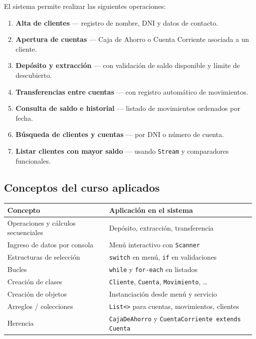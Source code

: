\documentclass[12pt, a4paper]{article}
\begin{document}
El sistema permite realizar las siguientes operaciones:

\begin{enumerate}[leftmargin=1.5cm, label=\arabic{*}.]
  \item \textbf{Alta de clientes} — registro de nombre, DNI y datos de contacto.
  \item \textbf{Apertura de cuentas} — Caja de Ahorro o Cuenta Corriente asociada a un cliente.
  \item \textbf{Depósito y extracción} — con validación de saldo disponible y límite de descubierto.
  \item \textbf{Transferencias entre cuentas} — con registro automático de movimientos.
  \item \textbf{Consulta de saldo e historial} — listado de movimientos ordenados por fecha.
  \item \textbf{Búsqueda de clientes y cuentas} — por DNI o número de cuenta.
  \item \textbf{Listar clientes con mayor saldo} — usando \texttt{Stream} y comparadores funcionales.
\end{enumerate}

\subsection{Conceptos del curso aplicados}

\begin{tabularx}{\textwidth}{@{} l X @{}}
  \toprule
  \textbf{Concepto} & \textbf{Aplicación en el sistema} \\
  \midrule
  Operaciones y cálculos secuenciales & Depósito, extracción, transferencia \\[4pt]
  Ingreso de datos por consola        & Menú interactivo con \texttt{Scanner} \\[4pt]
  Estructuras de selección            & \texttt{switch} en menú, \texttt{if} en validaciones \\[4pt]
  Bucles                              & \texttt{while} y \texttt{for-each} en listados \\[4pt]
  Creación de clases                  & \texttt{Cliente}, \texttt{Cuenta}, \texttt{Movimiento}, \ldots \\[4pt]
  Creación de objetos                 & Instanciación desde menú y servicio \\[4pt]
  Arreglos / colecciones              & \texttt{List<>} para cuentas, movimientos, clientes \\[4pt]
  Herencia                            & \texttt{CajaDeAhorro} y \texttt{CuentaCorriente extends Cuenta} \\
  \bottomrule
\end{tabularx}
\end{document}
